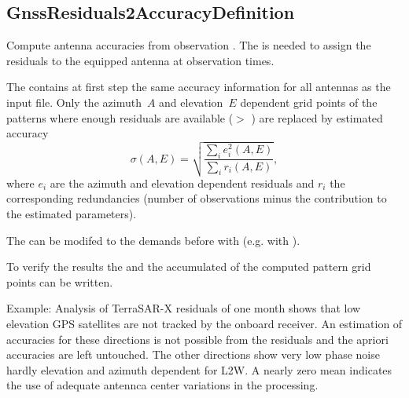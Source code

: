 \clearpage
\subsection{GnssResiduals2AccuracyDefinition}\label{GnssResiduals2AccuracyDefinition}
Compute antenna accuracies from observation .
The  is needed to assign
the residuals to the equipped antenna at observation times.

The  contains
at first step the same accuracy information for all antennas as the input file.
Only the azimuth~$A$ and elevation~$E$ dependent grid points of the patterns
where enough residuals are available ($>$ )
are replaced by estimated accuracy
\begin{equation}
 \sigma(A,E) = \sqrt{\frac{\sum_i e_i^2(A,E)}{\sum_i r_i(A,E)}},
\end{equation}
where $e_i$ are the azimuth and elevation dependent residuals and $r_i$ the
corresponding redundancies (number of observations minus the contribution to
the estimated parameters).

The  can be modifed
to the demands before with 
(e.g. with ).

To verify the results the 
and the accumulated 
of the computed pattern grid points can be written.

Example: Analysis of TerraSAR-X residuals of one month shows that low elevation
GPS satellites are not tracked by the onboard receiver. An estimation of accuracies
for these directions is not possible from the residuals and the apriori accuracies
are left untouched. The other directions show very low phase noise hardly elevation
and azimuth dependent for L2W. A nearly zero mean indicates the use of adequate antennca
center variations in the processing.



